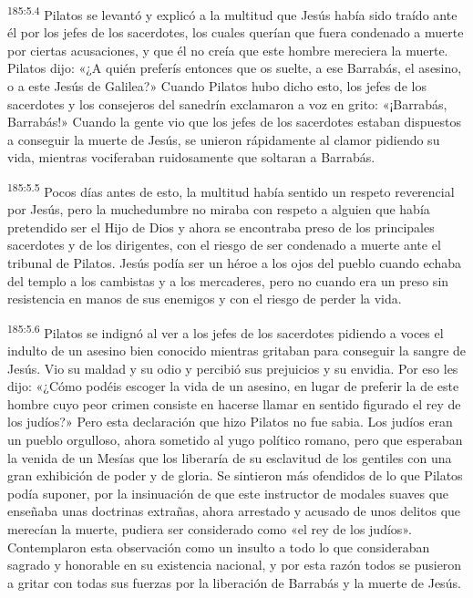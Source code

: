 \par 
\textsuperscript{185:5.4} Pilatos se levantó y explicó a la multitud que Jesús había sido traído ante él por los jefes de los sacerdotes, los cuales querían que fuera condenado a muerte por ciertas acusaciones, y que él no creía que este hombre mereciera la muerte. Pilatos dijo: «¿A quién preferís entonces que os suelte, a ese Barrabás, el asesino, o a este Jesús de Galilea?» Cuando Pilatos hubo dicho esto, los jefes de los sacerdotes y los consejeros del sanedrín exclamaron a voz en grito: «¡Barrabás, Barrabás!» Cuando la gente vio que los jefes de los sacerdotes estaban dispuestos a conseguir la muerte de Jesús, se unieron rápidamente al clamor pidiendo su vida, mientras vociferaban ruidosamente que soltaran a Barrabás.

\par 
\textsuperscript{185:5.5} Pocos días antes de esto, la multitud había sentido un respeto reverencial por Jesús, pero la muchedumbre no miraba con respeto a alguien que había pretendido ser el Hijo de Dios y ahora se encontraba preso de los principales sacerdotes y de los dirigentes, con el riesgo de ser condenado a muerte ante el tribunal de Pilatos. Jesús podía ser un héroe a los ojos del pueblo cuando echaba del templo a los cambistas y a los mercaderes, pero no cuando era un preso sin resistencia en manos de sus enemigos y con el riesgo de perder la vida.

\par 
\textsuperscript{185:5.6} Pilatos se indignó al ver a los jefes de los sacerdotes pidiendo a voces el indulto de un asesino bien conocido mientras gritaban para conseguir la sangre de Jesús. Vio su maldad y su odio y percibió sus prejuicios y su envidia. Por eso les dijo: «¿Cómo podéis escoger la vida de un asesino, en lugar de preferir la de este hombre cuyo peor crimen consiste en hacerse llamar en sentido figurado el rey de los judíos?» Pero esta declaración que hizo Pilatos no fue sabia. Los judíos eran un pueblo orgulloso, ahora sometido al yugo político romano, pero que esperaban la venida de un Mesías que los liberaría de su esclavitud de los gentiles con una gran exhibición de poder y de gloria. Se sintieron más ofendidos de lo que Pilatos podía suponer, por la insinuación de que este instructor de modales suaves que enseñaba unas doctrinas extrañas, ahora arrestado y acusado de unos delitos que merecían la muerte, pudiera ser considerado como «el rey de los judíos». Contemplaron esta observación como un insulto a todo lo que consideraban sagrado y honorable en su existencia nacional, y por esta razón todos se pusieron a gritar con todas sus fuerzas por la liberación de Barrabás y la muerte de Jesús.

